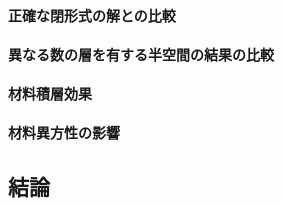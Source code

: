 \paragraph{正確な閉形式の解との比較}

\paragraph{異なる数の層を有する半空間の結果の比較}

\paragraph{材料積層効果}

\paragraph{材料異方性の影響}

\subsection{結論}
